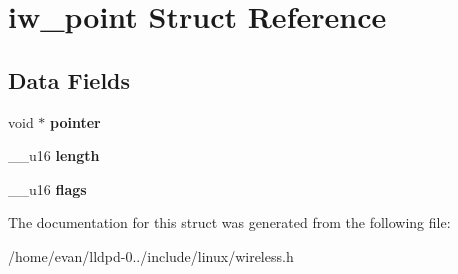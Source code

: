 \section{iw\-\_\-point \-Struct \-Reference}
\label{structiw__point}
\subsection*{\-Data \-Fields}
\begin{DoxyCompactItemize}
\item 
void $\ast$ {\bfseries pointer}\label{structiw__point_abc7cbbec1f024bd23164936bd765b06d}

\item 
\-\_\-\-\_\-u16 {\bfseries length}\label{structiw__point_ae819e710452c3cfae04c836bd1a3e13e}

\item 
\-\_\-\-\_\-u16 {\bfseries flags}\label{structiw__point_a9002b95db69f77b589a07d05560621ca}

\end{DoxyCompactItemize}


\-The documentation for this struct was generated from the following file\-:\begin{DoxyCompactItemize}
\item 
/home/evan/lldpd-\/0../include/linux/wireless.\-h\end{DoxyCompactItemize}

